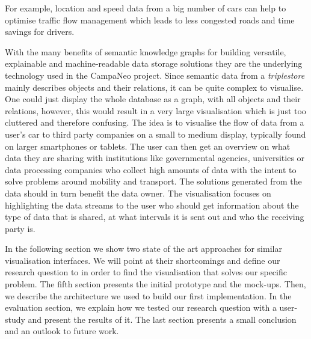   For example, location and speed data from a big number of cars can help to optimise traffic flow management which leads to less congested roads and time savings for drivers.
  
  With the many benefits of semantic knowledge graphs for building versatile, explainable and machine-readable data storage solutions they are the underlying technology used in the CampaNeo project. 
  Since semantic data from a \textit{triplestore} mainly describes objects and their relations, it can be quite complex to visualise. One could just display the whole database as a graph, with all objects and their relations, however, this would result in a very large visualisation which is just too cluttered and therefore confusing.
   The idea is to visualise the flow of data from a user's car to third party companies on a small to medium display, typically found on larger smartphones or tablets. The user can then get an overview on what data they are sharing with institutions like governmental agencies, universities or data processing companies who collect high amounts of data with the intent to solve problems around mobility and transport. The solutions generated from the data should in turn benefit the data owner. The visualisation focuses on highlighting the data streams to the user who should get information about the type of data that is shared, at what intervals it is sent out and who the receiving party is.
  
  In the following section we show two state of the art approaches for similar visualisation interfaces. We will point at their shortcomings and define our research question to in order to find the visualisation that solves our specific problem. The fifth section presents the initial prototype and the mock-ups. Then, we describe the architecture we used to build our first implementation. In the evaluation section, we explain how we tested our research question with a user-study and present the results of it. The last section presents a small conclusion and an outlook to future work.
